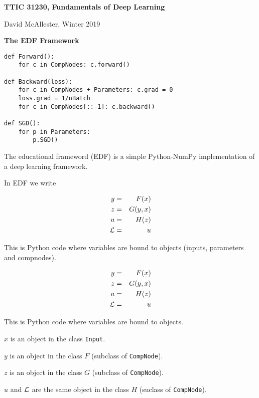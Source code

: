 




{\Huge

  \centerline{\bf TTIC 31230, Fundamentals of Deep Learning}
  \bigskip
  \centerline{David McAllester, Winter 2019}
  \vfill
  \vfill
  \centerline{\bf The EDF Framework}
  \vfill
  \vfill

  

\begin{verbatim}
def Forward():
    for c in CompNodes: c.forward()

def Backward(loss):
    for c in CompNodes + Parameters: c.grad = 0
    loss.grad = 1/nBatch
    for c in CompNodes[::-1]: c.backward()

def SGD():
    for p in Parameters:
        p.SGD()
\end{verbatim}
\vfill


The educational frameword (EDF) is a simple Python-NumPy implementation of a deep learning framework.

\vfill
In EDF we write

\vfill
\begin{eqnarray*}
  y & = & F(x) \\
  z & = & G(y,x) \\
  u & = & H(z) \\
  {\cal L} &  = &  u
\end{eqnarray*}
\medskip

\vfill
This is Python code where variables are bound to objects (inputs, parameters and compnodes).


\begin{eqnarray*}
  y & = & F(x) \\
  z & = & G(y,x) \\
  u & = & H(z) \\
  {\cal L} &  = &  u
\end{eqnarray*}

\vfill
This is Python code where variables are bound to objects.

\vfill
$x$ is an object in the class {\tt Input}.

\vfill
$y$ is an object in the class $F$ (subclass of {\tt CompNode}).

\vfill
$z$ is an object in the class $G$ (subclass of {\tt CompNode}).

\medskip
$u$ and ${\cal L}$ are the same object in the class $H$ (suclass of {\tt CompNode}).

}
